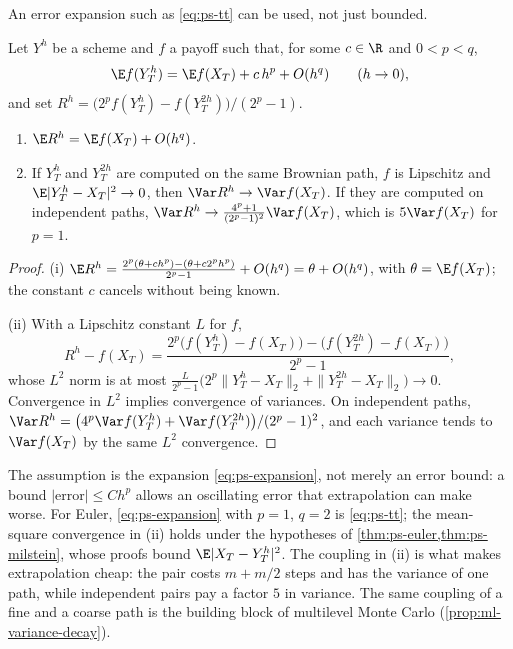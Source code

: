 An error expansion such as \eqref{eq:ps-tt} can be used, not just bounded.

\begin{proposition}\label{prop:ps-richardson}
Let $Y^h$ be a scheme and $f$ a payoff such that, for some $c\in\R$ and $0<p<q$,
\begin{equation}\label{eq:ps-expansion}
  \E f(Y^h_T)=\E f(X_T)+c\,h^p+O(h^q)\qquad(h\to0),
\end{equation}
and set $R^h=\big(2^pf(Y^h_T)-f(Y^{2h}_T)\big)/(2^p-1)$.
\begin{enumerate}[label=(\roman*)]
  \item $\E R^h=\E f(X_T)+O(h^q)$.
  \item If $Y^h_T$ and $Y^{2h}_T$ are computed on the same Brownian path, $f$ is Lipschitz
    and $\E|Y^h_T-X_T|^2\to0$, then $\Var R^h\to\Var f(X_T)$. If they are computed on
    independent paths, $\Var R^h\to\frac{4^p+1}{(2^p-1)^2}\Var f(X_T)$, which is
    $5\Var f(X_T)$ for $p=1$.
\end{enumerate}
\end{proposition}

\begin{proof}
(i) $\E R^h=\frac{2^p(\theta+ch^p)-(\theta+c2^ph^p)}{2^p-1}+O(h^q)=\theta+O(h^q)$, with
$\theta=\E f(X_T)$; the constant $c$ cancels without being known.

(ii) With a Lipschitz constant $L$ for $f$,
\[
  R^h-f(X_T)=\frac{2^p\big(f(Y^h_T)-f(X_T)\big)-\big(f(Y^{2h}_T)-f(X_T)\big)}{2^p-1},
\]
whose $L^2$ norm is at most
$\frac{L}{2^p-1}\big(2^p\|Y^h_T-X_T\|_2+\|Y^{2h}_T-X_T\|_2\big)\to0$. Convergence in $L^2$
implies convergence of variances. On independent paths,
$\Var R^h=\big(4^p\Var f(Y^h_T)+\Var f(Y^{2h}_T)\big)/(2^p-1)^2$, and each variance tends to
$\Var f(X_T)$ by the same $L^2$ convergence.
\end{proof}

The assumption is the expansion \eqref{eq:ps-expansion}, not merely an error bound: a bound
$|\text{error}|\le Ch^p$ allows an oscillating error that extrapolation can make worse. For
Euler, \eqref{eq:ps-expansion} with $p=1$, $q=2$ is \eqref{eq:ps-tt}; the mean-square
convergence in (ii) holds under the hypotheses of \cref{thm:ps-euler,thm:ps-milstein},
whose proofs bound $\E|X_T-Y^h_T|^2$. The coupling in (ii) is what makes extrapolation
cheap: the pair costs $m+m/2$ steps and has the variance of one path, while independent
pairs pay a factor $5$ in variance. The same coupling of a fine and a coarse path is the
building block of multilevel Monte Carlo (\cref{prop:ml-variance-decay}).

